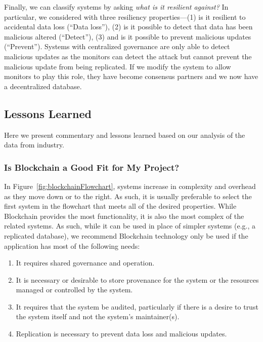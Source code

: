 Finally, we can classify systems by asking \emph{what is it resilient against?}
In particular, we considered with three resiliency properties---(1) is it resilient to accidental data loss (``Data loss''), (2) is it possible to detect that data has been malicious altered (``Detect''), (3) and is it possible to prevent malicious updates (``Prevent'').
Systems with centralized governance are only able to detect malicious updates as the monitors can detect the attack but cannot prevent the malicious update from being replicated.
If we modify the system to allow monitors to play this role, they have become consensus partners and we now have a decentralized database.

\subsection{Lessons Learned}
Here we present commentary and lessons learned based on our analysis of the data from industry.

\subsubsection{Is Blockchain a Good Fit for My Project?}
In Figure~\ref{fig:blockchainFlowchart}, systems increase in complexity and overhead as they move down or to the right.
As such, it is usually preferable to select the first system in the flowchart that meets all of the desired properties.
While Blockchain provides the most functionality, it is also the most complex of the related systems.
As such, while it can be used in place of simpler systems (e.g., a replicated database), we recommend Blockchain technology only be used if the application has most of the following needs:

\begin{enumerate}
	\item It requires shared governance and operation.
	\item It is necessary or desirable to store provenance for the system or the resources managed or controlled by the system.
	\item It requires that the system be audited, particularly if there is a desire to trust the system itself and not the system's maintainer(s).
	\item Replication is necessary to prevent data loss and malicious updates.
\end{enumerate}

